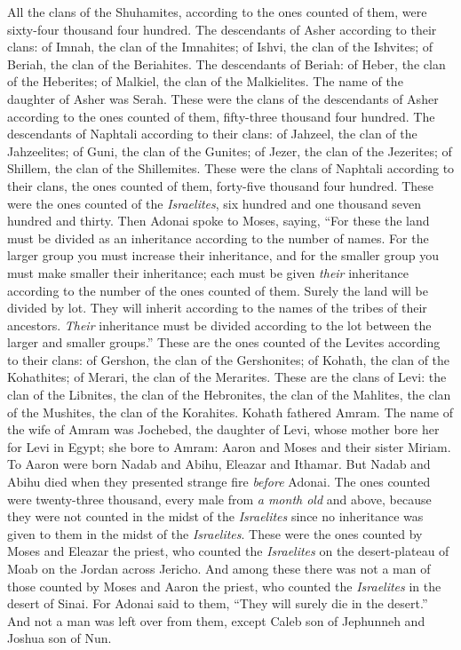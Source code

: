 \begin{biblechapter}
\verse All the clans of the Shuhamites, according to the ones counted of them, were sixty-four thousand four hundred.
\verse The descendants of Asher according to their clans: of Imnah, the clan of the Imnahites; of Ishvi, the clan of the Ishvites; of Beriah, the clan of the Beriahites.
\verse The descendants of Beriah: of Heber, the clan of the Heberites; of Malkiel, the clan of the Malkielites.
\verse The name of the daughter of Asher was Serah.
\verse These were the clans of the descendants of Asher according to the ones counted of them, fifty-three thousand four hundred.
\verse The descendants of Naphtali according to their clans: of Jahzeel, the clan of the Jahzeelites; of Guni, the clan of the Gunites;
\verse of Jezer, the clan of the Jezerites; of Shillem, the clan of the Shillemites.
\verse These were the clans of Naphtali according to their clans, the ones counted of them, forty-five thousand four hundred.
\verse These were the ones counted of the \textit{Israelites}, six hundred and one thousand seven hundred and thirty.
\verse Then Adonai spoke to Moses, saying,
\verse “For these the land must be divided as an inheritance according to the number of names.
\verse For the larger group you must increase their inheritance, and for the smaller group you must make smaller their inheritance; each must be given \textit{their} inheritance according to the number of the ones counted of them.
\verse Surely the land will be divided by lot. They will inherit according to the names of the tribes of their ancestors.
\verse \textit{Their} inheritance must be divided according to the lot between the larger and smaller groups.”
\verse These are the ones counted of the Levites according to their clans: of Gershon, the clan of the Gershonites; of Kohath, the clan of the Kohathites; of Merari, the clan of the Merarites.
\verse These are the clans of Levi: the clan of the Libnites, the clan of the Hebronites, the clan of the Mahlites, the clan of the Mushites, the clan of the Korahites. Kohath fathered Amram.
\verse The name of the wife of Amram was Jochebed, the daughter of Levi, whose mother bore her for Levi in Egypt; she bore to Amram: Aaron and Moses and their sister Miriam.
\verse To Aaron were born Nadab and Abihu, Eleazar and Ithamar.
\verse But Nadab and Abihu died when they presented strange fire \textit{before} Adonai.
\verse The ones counted were twenty-three thousand, every male from \textit{a month old} and above, because they were not counted in the midst of the \textit{Israelites} since no inheritance was given to them in the midst of the \textit{Israelites}.
\verse These were the ones counted by Moses and Eleazar the priest, who counted the \textit{Israelites} on the desert-plateau of Moab on the Jordan across Jericho.
\verse And among these there was not a man of those counted by Moses and Aaron the priest, who counted the \textit{Israelites} in the desert of Sinai.
\verse For Adonai said to them, “They will surely die in the desert.” And not a man was left over from them, except Caleb son of Jephunneh and Joshua son of Nun.
\end{biblechapter}

